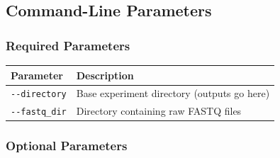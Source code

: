 \documentclass[
]{article}
\newcounter{none} %
\begin{document}
\subsection{Command-Line Parameters}\label{command-line-parameters}

\subsubsection{Required Parameters}\label{required-parameters}

{\def\LTcaptype{none} %
\begin{longtable}[]{@{}ll@{}}
\toprule\noalign{}
Parameter & Description \\
\midrule\noalign{}
\endhead
\bottomrule\noalign{}
\endlastfoot
\texttt{-\/-directory} & Base experiment directory (outputs go here) \\
\texttt{-\/-fastq\_dir} & Directory containing raw FASTQ files \\
\end{longtable}
}

\subsubsection{Optional Parameters}\label{optional-parameters}
\end{document}
